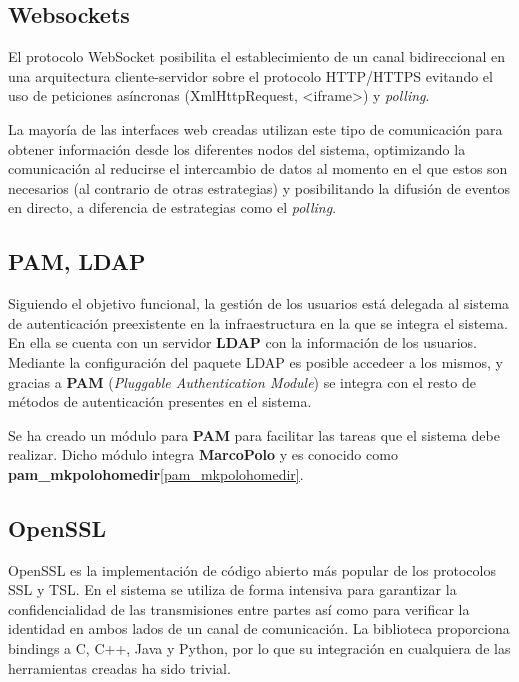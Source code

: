 \subsection{Websockets}

El protocolo WebSocket \cite{rfc6455} posibilita el establecimiento de un canal bidireccional en una arquitectura cliente-servidor sobre el protocolo HTTP/HTTPS evitando el uso de peticiones asíncronas (XmlHttpRequest, <iframe>) y \textit{polling}.

La mayoría de las interfaces web creadas utilizan este tipo de comunicación para obtener información desde los diferentes nodos del sistema, optimizando la comunicación al reducirse el intercambio de datos al momento en el que estos son necesarios (al contrario de otras estrategias) y posibilitando la difusión de eventos en directo, a diferencia de estrategias como el \textit{polling}.

\subsection{PAM, LDAP}

Siguiendo el objetivo funcional\citationneeded, la gestión de los usuarios está delegada al sistema de autenticación preexistente en la infraestructura en la que se integra el sistema. En ella se cuenta con un servidor \textbf{LDAP} con la información de los usuarios. Mediante la configuración del paquete LDAP es posible accedeer a los mismos, y gracias a \textbf{PAM} (\textit{Pluggable Authentication Module}) se integra con el resto de métodos de autenticación presentes en el sistema.

Se ha creado un módulo para \textbf{PAM} para facilitar las tareas que el sistema debe realizar. Dicho módulo integra \textbf{MarcoPolo} y es conocido como \textbf{pam\_mkpolohomedir}\ref{pam_mkpolohomedir}. 

\subsection{OpenSSL}

OpenSSL es la implementación de código abierto más popular de los protocolos SSL y TSL. En el sistema se utiliza de forma intensiva para garantizar la confidencialidad de las transmisiones entre partes así como para verificar la identidad en ambos lados de un canal de comunicación. La biblioteca proporciona bindings a C, C++, Java y Python, por lo que su integración en cualquiera de las herramientas creadas ha sido trivial. 

